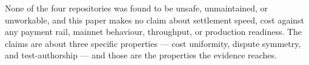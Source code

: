 \documentclass[sigconf,review]{acmart}
\begin{document}
None of the four repositories was found to be unsafe, unmaintained, or
unworkable, and this paper makes no claim about settlement speed, cost against
any payment rail, mainnet behaviour, throughput, or production readiness. The
claims are about three specific properties --- cost uniformity, dispute
symmetry, and test-authorship --- and those are the properties the evidence
reaches.

\end{document}
